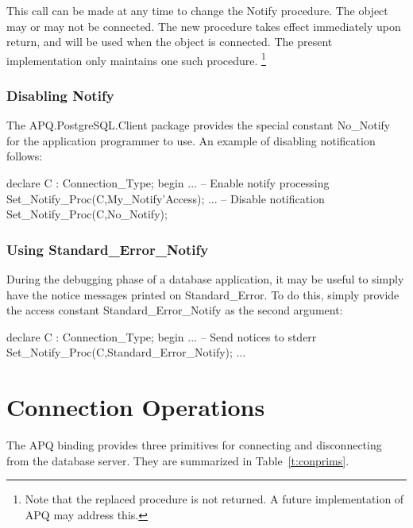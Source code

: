 \documentclass[english,letterpaper]{book}
\begin{document}
This call can be made at any time to change the Notify procedure.
The object may or may not be connected. The new procedure takes effect
immediately upon return, and will be used when the object is connected.
The present implementation only maintains one such procedure.%
\footnote{Note that the replaced procedure is not returned. A future implementation
of APQ may address this.%
}


\subsubsection{Disabling Notify}

The APQ\-.PostgreSQL\-.Client package 
provides the special constant No\_Notify
for the application programmer to use. An example of disabling notification
follows:

\begin{Example}
declare
   C : Connection_Type;
begin
   ...
   -- Enable notify processing
   Set_Notify_Proc(C,My_Notify'Access);
   ...
   -- Disable notification
   Set_Notify_Proc(C,No_Notify);
\end{Example}

\subsubsection{Using Standard\_Error\_Notify}

During the debugging phase of a database application, it may be useful
to simply have the notice messages printed on Standard\_Error. To
do this, simply provide the access constant Standard\_Error\_Notify
as the second argument:

\begin{Example}
declare
   C : Connection_Type;
begin
   ...
   -- Send notices to stderr
   Set_Notify_Proc(C,Standard_Error_Notify);
   ...
\end{Example}

\section{Connection Operations}

The APQ binding provides three primitives for connecting and disconnecting
from the database server. They are summarized in Table~\ref{t:conprims}.
\end{document}
